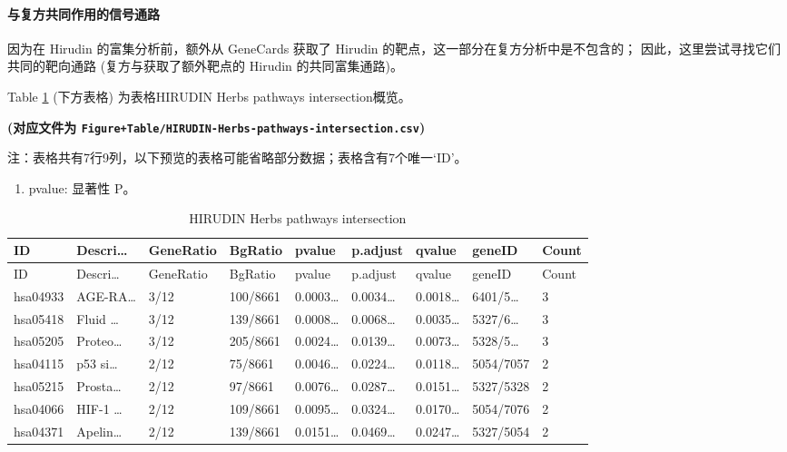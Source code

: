 \documentclass[
]{article}
\providecommand{\tightlist}{%
  \setlength{\itemsep}{0pt}\setlength{\parskip}{0pt}}
\begin{document}
\hypertarget{ux4e0eux590dux65b9ux5171ux540cux4f5cux7528ux7684ux4fe1ux53f7ux901aux8def}{%
\paragraph{与复方共同作用的信号通路}\label{ux4e0eux590dux65b9ux5171ux540cux4f5cux7528ux7684ux4fe1ux53f7ux901aux8def}}

因为在 Hirudin 的富集分析前，额外从 GeneCards 获取了 Hirudin 的靶点，这一部分在复方分析中是不包含的；
因此，这里尝试寻找它们共同的靶向通路 (复方与获取了额外靶点的 Hirudin 的共同富集通路)。

Table \ref{tab:HIRUDIN-Herbs-pathways-intersection} (下方表格) 为表格HIRUDIN Herbs pathways intersection概览。

\textbf{(对应文件为 \texttt{Figure+Table/HIRUDIN-Herbs-pathways-intersection.csv})}

\begin{center}\begin{tcolorbox}[colback=gray!10, colframe=gray!50, width=0.9\linewidth, arc=1mm, boxrule=0.5pt]注：表格共有7行9列，以下预览的表格可能省略部分数据；表格含有7个唯一`ID'。
\end{tcolorbox}
\end{center}
\begin{center}\begin{tcolorbox}[colback=gray!10, colframe=gray!50, width=0.9\linewidth, arc=1mm, boxrule=0.5pt]\begin{enumerate}\tightlist
\item pvalue:  显著性 P。
\end{enumerate}\end{tcolorbox}
\end{center}

\begin{longtable}[]{@{}lllllllll@{}}
\caption{\label{tab:HIRUDIN-Herbs-pathways-intersection}HIRUDIN Herbs pathways intersection}\tabularnewline
\toprule
ID & Descri\ldots{} & GeneRatio & BgRatio & pvalue & p.adjust & qvalue & geneID & Count\tabularnewline
\midrule
\endfirsthead
\toprule
ID & Descri\ldots{} & GeneRatio & BgRatio & pvalue & p.adjust & qvalue & geneID & Count\tabularnewline
\midrule
\endhead
hsa04933 & AGE-RA\ldots{} & 3/12 & 100/8661 & 0.0003\ldots{} & 0.0034\ldots{} & 0.0018\ldots{} & 6401/5\ldots{} & 3\tabularnewline
hsa05418 & Fluid \ldots{} & 3/12 & 139/8661 & 0.0008\ldots{} & 0.0068\ldots{} & 0.0035\ldots{} & 5327/6\ldots{} & 3\tabularnewline
hsa05205 & Proteo\ldots{} & 3/12 & 205/8661 & 0.0024\ldots{} & 0.0139\ldots{} & 0.0073\ldots{} & 5328/5\ldots{} & 3\tabularnewline
hsa04115 & p53 si\ldots{} & 2/12 & 75/8661 & 0.0046\ldots{} & 0.0224\ldots{} & 0.0118\ldots{} & 5054/7057 & 2\tabularnewline
hsa05215 & Prosta\ldots{} & 2/12 & 97/8661 & 0.0076\ldots{} & 0.0287\ldots{} & 0.0151\ldots{} & 5327/5328 & 2\tabularnewline
hsa04066 & HIF-1 \ldots{} & 2/12 & 109/8661 & 0.0095\ldots{} & 0.0324\ldots{} & 0.0170\ldots{} & 5054/7076 & 2\tabularnewline
hsa04371 & Apelin\ldots{} & 2/12 & 139/8661 & 0.0151\ldots{} & 0.0469\ldots{} & 0.0247\ldots{} & 5327/5054 & 2\tabularnewline
\bottomrule
\end{longtable}
\end{document}

